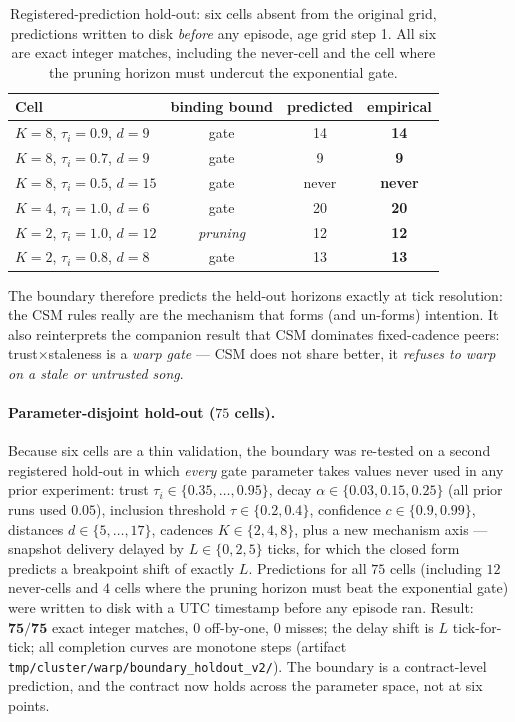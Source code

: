 \documentclass{article}
\begin{document}
\begin{table}[h]
\centering
\caption{Registered-prediction hold-out: six cells absent from the
original grid, predictions written to disk \emph{before} any episode,
age grid step 1. All six are exact integer matches, including the
never-cell and the cell where the pruning horizon must undercut the
exponential gate.}
\label{p2:tab:holdout}
\small
\begin{tabular}{lccc}
\toprule
Cell & binding bound & predicted & empirical \\
\midrule
$K{=}8$, $\tau_i{=}0.9$, $d{=}9$  & gate    & 14 & \textbf{14} \\
$K{=}8$, $\tau_i{=}0.7$, $d{=}9$  & gate    & 9  & \textbf{9}  \\
$K{=}8$, $\tau_i{=}0.5$, $d{=}15$ & gate    & never & \textbf{never} \\
$K{=}4$, $\tau_i{=}1.0$, $d{=}6$  & gate    & 20 & \textbf{20} \\
$K{=}2$, $\tau_i{=}1.0$, $d{=}12$ & \emph{pruning} & 12 & \textbf{12} \\
$K{=}2$, $\tau_i{=}0.8$, $d{=}8$  & gate    & 13 & \textbf{13} \\
\bottomrule
\end{tabular}
\end{table}

The boundary therefore predicts the held-out horizons exactly at tick resolution: the CSM rules
really are the mechanism that forms (and un-forms) intention. It also
reinterprets the companion result \citep{songlines3} that CSM dominates fixed-cadence
peers: trust$\times$staleness is a \emph{warp gate} --- CSM does not
share better, it \emph{refuses to warp on a stale or untrusted song}.

\paragraph{Parameter-disjoint hold-out ($75$ cells).} Because six
cells are a thin validation, the boundary was re-tested on a second
registered hold-out in which \emph{every} gate parameter takes values
never used in any prior experiment: trust
$\tau_i \in \{0.35, \dots, 0.95\}$, decay
$\alpha \in \{0.03, 0.15, 0.25\}$ (all prior runs used $0.05$),
inclusion threshold $\tau \in \{0.2, 0.4\}$, confidence
$c \in \{0.9, 0.99\}$, distances $d \in \{5,\dots,17\}$, cadences
$K \in \{2,4,8\}$, plus a new mechanism axis --- snapshot delivery
delayed by $L \in \{0,2,5\}$ ticks, for which the closed form
predicts a breakpoint shift of exactly $L$. Predictions for all $75$
cells (including $12$ never-cells and $4$ cells where the pruning
horizon must beat the exponential gate) were written to disk with a
UTC timestamp before any episode ran. Result: $\mathbf{75/75}$ exact
integer matches, $0$ off-by-one, $0$ misses; the delay shift is
$L$ tick-for-tick; all completion curves are monotone steps (artifact
\texttt{tmp/cluster/warp/boundary\_holdout\_v2/}). The boundary is a
contract-level prediction, and the contract now holds across the
parameter space, not at six points.
\end{document}
